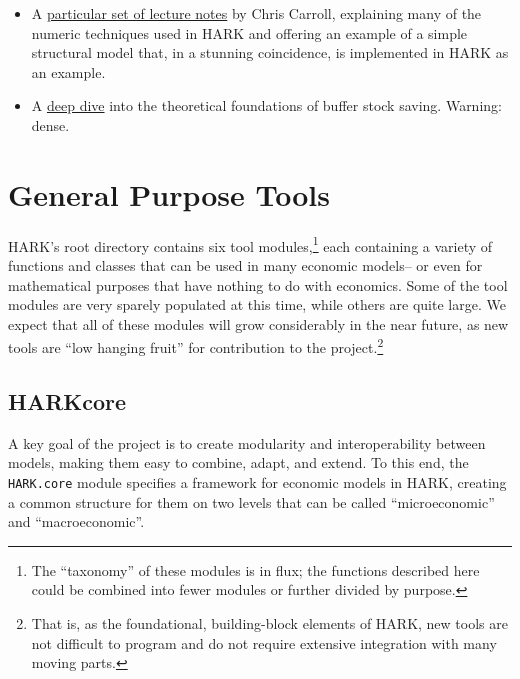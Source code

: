 \documentclass[12pt,titlepage,letterpaper]{econtex}
\begin{document}
{\begin{itemize}
\item A \href{http://www.econ2.jhu.edu/people/ccarroll/SolvingMicroDSOPs/}{particular set of lecture notes} by Chris Carroll, explaining many of the numeric techniques used in HARK and offering an example of a simple structural model that, in a stunning coincidence, is implemented in HARK as an example.

\item A \href{http://www.econ2.jhu.edu/people/ccarroll/BufferStockTheory.pdf}{deep dive} into the theoretical foundations of buffer stock saving.  Warning: dense.

\end{itemize}


\section{General Purpose Tools}\label{sec:GeneralPurposeTools}

HARK's root directory contains six tool modules,\footnote{The ``taxonomy'' of these modules is in flux; the functions described here could be combined into fewer modules or further divided by purpose.} each containing a variety of functions and classes that can be used in many economic models-- or even for mathematical purposes that have nothing to do with economics.  Some of the tool modules are very sparely populated at this time, while others are quite large.  We expect that all of these modules will grow considerably in the near future, as new tools are ``low hanging fruit'' for contribution to the project.\footnote{That is, as the foundational, building-block elements of HARK, new tools are not difficult to program and do not require extensive integration with many moving parts.}

\subsection{HARKcore}\label{sec:HARKcore}

A key goal of the project is to create modularity and interoperability between models, making them easy to combine, adapt, and extend.  To this end, the \texttt{HARK.core} module specifies a framework for economic models in HARK, creating a common structure for them on two levels that can be called ``microeconomic'' and ``macroeconomic''.

}
\end{document}
